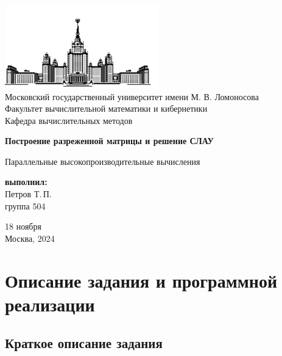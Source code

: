 \documentclass[12pt, a4paper]{article}
\begin{document}
	
\thispagestyle{empty}

\begin{center}
	\ \vspace{-3cm}
	
	\includegraphics[width=0.5\textwidth]{msu-eps-converted-to.pdf}\\
	{Московский государственный университет имени М. В. Ломоносова}\\
	Факультет вычислительной математики и кибернетики\\
	Кафедра вычислительных методов
	
	\vspace{6cm}
	
	{\Large \bfseries Построение разреженной матрицы и решение СЛАУ}
	
	\vspace{1cm}
	
	{\large Параллельные высокопроизводительные вычисления}
\end{center}

\vfill

\begin{flushright}
	\textbf{выполнил:}\\
	Петров Т.\,П. \\
	группа 504
\end{flushright}

\vfill

\begin{center}
	18 ноября \\
	Москва, 2024
\end{center}

\enlargethispage{2\baselineskip}

\newpage

\tableofcontents

\newpage

\section{Описание задания и программной реализации}
\subsection{Краткое описание задания}
\end{document}
